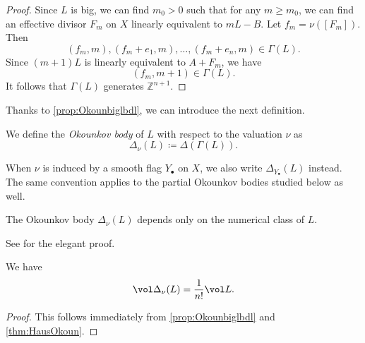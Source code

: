 \begin{proof}
Since $L$ is big, we can find $m_0>0$ such that for any $m\geq m_0$, we can find an effective divisor $F_m$ on $X$ linearly equivalent to $mL-B$. Let $f_m=\nu([F_m])$. Then
\[
(f_m,m),(f_m+e_1,m),\dots,(f_m+e_n,m)\in \Gamma(L).
\]
Since $(m+1)L$ is linearly equivalent to $A+F_m$, we have
\[
(f_m,m+1)\in \Gamma(L).
\]
It follows that $\Gamma(L)$ generates $\mathbb{Z}^{n+1}$.
\end{proof}

Thanks to \cref{prop:Okounbiglbdl}, we can introduce the next definition.
\begin{definition}\label{def:Okobd}
    We define the \emph{Okounkov body} of $L$ with respect to the valuation $\nu$ as
    \[
    \Delta_{\nu}(L)\coloneqq \Delta(\Gamma(L)).
    \]
\end{definition}
When $\nu$ is induced by a smooth flag $Y_{\bullet}$ on $X$, we also write $\Delta_{Y_{\bullet}}(L)$ instead. The same convention applies to the partial Okounkov bodies studied below as well.

\begin{proposition}\label{prop:Okounonlydepnum}
    The Okounkov body $\Delta_{\nu}(L)$ depends only on the numerical class of $L$.
\end{proposition}
See \cite[Proposition~4.1]{LM09} for the elegant proof.

\begin{corollary}\label{cor:Okounvol}
    We have
    \begin{equation}
        \vol \Delta_{\nu}(L)=\frac{1}{n!}\vol L.
    \end{equation}
\end{corollary}
\begin{proof}
    This follows immediately from \cref{prop:Okounbiglbdl} and \cref{thm:HausOkoun}.
\end{proof}


